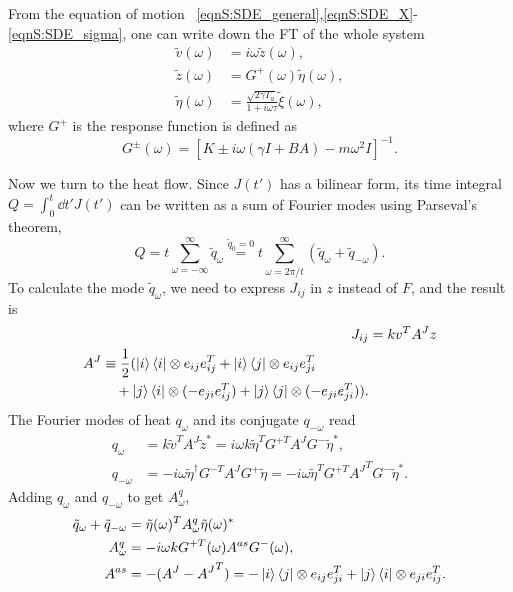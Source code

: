 \documentclass[
 amsmath,amssymb,
 aps,
 pre,
 longbibliography,
 10pt, onecolumn,
 notitlepage
]{revtex4-1}
\begin{document}
From the equation of motion \eqnname~\eqref{eqnS:SDE_general},\eqref{eqnS:SDE_X}-\eqref{eqnS:SDE_sigma}, one can write down the FT of the whole system
\begin{align}
\tilde{v}(\omega) &= i\omega \tilde{z}(\omega) ,\label{eqnS:FT_v}\\
\tilde{z}(\omega) &= G^+(\omega) \tilde{\eta}(\omega) ,\label{eqnS:FT_z}\\
\tilde{\eta}(\omega) &= \frac{\sqrt{2\gamma T_a}}{1 + i\omega \tau} \tilde{\xi}(\omega) ,\label{eqnS:FT_eta}
\end{align}
where $G^+$ is the response function is defined as
\begin{equation} \label{eqnS:response}
G^{\pm}(\omega) = [K \pm i\omega(\gamma I + BA) - m\omega^2I]^{-1} .
\end{equation}

Now we turn to the heat flow.
Since $J(t')$ has a bilinear form, its time integral $Q = \int_0^t \dd{t'} J(t')$ can be written as a sum of Fourier modes using Parseval's theorem,
\begin{equation} \label{eqnS:qmode_sum}
Q = t\sum_{\omega=-\infty}^{\infty} \tilde{q}_\omega
\overset{\tilde{q}_0 = 0}{=}  t\sum_{\omega=2\pi/t}^{\infty} (\tilde{q}_\omega + \tilde{q}_{-\omega}) .
\end{equation}
To calculate the mode $\tilde{q}_\omega$, we need to express $J_{ij}$ in $z$ instead of $F$, and the result is
\begin{align}
J_{ij} &= kv^TA^{J}z \\
\begin{split}
A^{J} &\equiv \frac{1}{2} (\ket{i}\bra{i} \otimes e_{ij}e_{ij}^T + \ket{i}\bra{j} \otimes e_{ij}e_{ji}^T \\
&\quad + \ket{j}\bra{i} \otimes (-e_{ji}e_{ij}^T) + \ket{j}\bra{j} \otimes (-e_{ji}e_{ji}^T)) .
\end{split}
\end{align}
The Fourier modes of heat $q_\omega$ and its conjugate $q_{-\omega}$ read
\begin{align}
q_\omega &= k\tilde{v}^T A^{J} \tilde{z}^*
= i\omega k \tilde{\eta}^TG^{+T}A^{J}G^-\tilde{\eta}^* ,\\
q_{-\omega} &= -i\omega \tilde{\eta}^\dagger G^{-T}A^{J}G^+\tilde{\eta}
= -i\omega \tilde{\eta}^TG^{+T}{A^{J}}^TG^-\tilde{\eta}^* .
\end{align}
Adding $q_\omega$ and $q_{-\omega}$ to get $A_\omega^q$,
\begin{align}
\tilde{q}_\omega + \tilde{q}_{-\omega} &= \tilde{\eta}(\omega)^T A_\omega^q \tilde{\eta}(\omega)^* \\
A_\omega^q &= -i\omega k G^{+T}(\omega) A^{as} G^-(\omega), \\
A^{as} &= -(A^{J} - {A^{J}}^T)
= -\ket{i}\bra{j} \otimes e_{ij}e_{ji}^T + \ket{j}\bra{i} \otimes e_{ji}e_{ij}^T .
\end{align}
\end{document}
